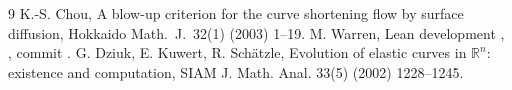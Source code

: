 \documentclass[11pt]{article}
\begin{document}
\begin{thebibliography}{9}
 K.-S. Chou, A blow-up criterion for the curve shortening flow by surface diffusion, Hokkaido Math.\ J.\ 32(1) (2003) 1--19.
 M. Warren, Lean development , , commit .
 G. Dziuk, E. Kuwert, R. Sch{\"a}tzle, Evolution of elastic curves in $\mathbb R^n$: existence and computation, SIAM J. Math. Anal. 33(5) (2002) 1228--1245.
\end{thebibliography}
\end{document}

